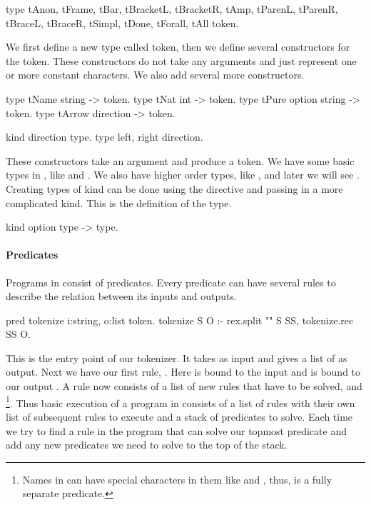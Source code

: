 \documentclass[thesis.tex]{subfiles}
\begin{document}
{{\begin{elpicode}
  type tAnon, tFrame, tBar, tBracketL, tBracketR, tAmp,
       tParenL, tParenR, tBraceL, tBraceR, tSimpl,
       tDone, tForall, tAll token.
\end{elpicode}
We first define a new type called token, then we define several constructors for the token. These constructors do not take any arguments and just represent one or more constant characters. We also add several more constructors.
\begin{elpicode}
  type tName string -> token.
  type tNat int -> token.
  type tPure option string -> token.
  type tArrow direction -> token.

  kind direction type.
  type left, right direction.
\end{elpicode}
These constructors take an argument and produce a token. We have some basic types in \elpi, like  and . We also have higher order types, like , and later we will see .
Creating types of kind  can be done using the  directive and passing in a more complicated kind. This is the definition of the  type.
\begin{elpicode}
  kind option type -> type.
\end{elpicode}

\paragraph*{Predicates}
Programs in \elpi consist of predicates. Every predicate can have several rules to describe the relation between its inputs and outputs.
\begin{elpicode}
  pred tokenize i:string, o:list token.
  tokenize S O :- 
    rex.split "" S SS,
    tokenize.rec SS O.
\end{elpicode}
This is the entry point of our tokenizer. It takes  as input and gives a list of  as output. Next we have our first rule, . Here  is bound to the input  and  is bound to our output .
A rule now consists of a list of new rules that have to be solved,  and \footnote{Names in \elpi can have special characters in them like  and \elpiinline{-}, thus,  is a fully separate predicate.}. Thus basic execution of a program in \elpi consists of a list of rules with their own list of subsequent rules to execute and a stack of predicates to solve. Each time we try to find a rule in the program that can solve our topmost predicate and add any new predicates we need to solve to the top of the stack.

}}
\end{document}
